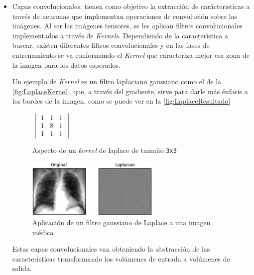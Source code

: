 \begin{itemize}
    \item Capas convolucionales: tienen como objetivo la extracción de carácteristicas a través de neuronas que implementan operaciones de convolución sobre las imágenes. 
    Al ser las imágenes tensores, se les aplican filtros convolucionales implementados a través de \textit{Kernels}. 
    Dependiendo de la característica a buscar, existen diferentes filtros convolucionales y en las fases de entrenamiento se va conformando el \textit{Kernel} que caracteriza mejor esa zona de la imagen para los datos esperados.

    Un ejemplo de \textit{Kernel} es un filtro laplaciano gaussiano como el de la \autoref{fig:LaplaceKernel}, que, a través del gradiente, sirve para darle más énfasis a los bordes de la imagen, como se puede ver 
    en la \autoref{fig:LaplaceResultado}
    \begin{figure}[H]
        \centering
        \(
        \begin{vmatrix}
            1 & 1 & 1 \\
            1 & 8 & 1 \\
            1 & 1 & 1
        \end{vmatrix}
        \)
        \caption{Aspecto de un \textit{kernel} de laplace de tamaño \texttt{3x3}}
        \label{fig:LaplaceKernel}
    \end{figure}
    \begin{figure}[H]
        \centering
        \includegraphics[width=0.6\textwidth]{images/4/KernelsTipicos.jpg}
        \caption{Aplicación de un filtro gaussiano de Laplace a una imagen médica\cite{LaplacianFilterOverview}}
        \label{fig:LaplaceResultado}
    \end{figure}

    Estas capas convolucionales van obteniendo la abstracción de las características transformando los volúmenes de entrada a volúmenes de salida.


\end{itemize}
